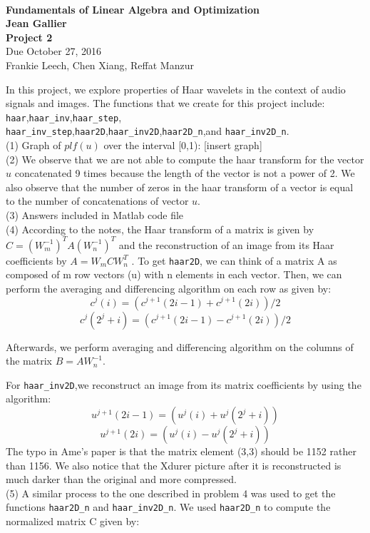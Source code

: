 \documentclass[12pt]{article}
\begin{document}
\begin{center}
\\
\vspace{1cm}
{\Large\bf Fundamentals of Linear Algebra and Optimization\\
Jean Gallier \\
\vspace{0.5cm}
Project 2}\\[10pt]
Due October 27, 2016\\
Frankie Leech, Chen Xiang, Reffat Manzur\\
\end{center}

\vspace{0.5cm}

\medskip

In this project, we explore properties of Haar wavelets in the context of audio signals and images. The functions that we create for this project include: {\tt haar},{\tt haar\_inv},{\tt haar\_step},\\{\tt haar\_inv\_step},{\tt haar2D},{\tt haar\_inv2D},{\tt haar2D\_n},and {\tt haar\_inv2D\_n}.
\medskip\\
(1) Graph of $plf(u)$ over the interval [0,1):
[insert graph]
\medskip
\\(2) We observe that we are not able to compute the haar transform for the vector $u$ concatenated 9 times because the length of the vector is not a power of 2. We also observe that the number of zeros in the haar transform of a vector is equal to the number of concatenations of vector $u$.
\medskip\\
(3) Answers included in Matlab code file
\medskip\\
(4)
According to the notes, the Haar transform of a matrix is given by $C = (W_m^{-1})^T A (W_n^{-1})^T$ and the reconstruction of an image from its Haar coefficients by $A = W_m C W_n^T$ . To get {\tt haar2D}, we can think of a matrix A as    composed of m row vectors (u) with n elements in each vector. Then, we can perform the averaging and differencing algorithm on each row as given by:
$$c^j(i) = (c^{j+1}(2i -1) + c^{j+1}(2i))/2$$  
$$c^j(2^j+i) = (c^{j+1}(2i -1) - c^{j+1}(2i))/2$$ 

Afterwards, we perform averaging and differencing algorithm on the columns of the matrix $B=A W_n^{-1}$.

For {\tt haar\_inv2D},we reconstruct an image from its matrix coefficients by using the algorithm: 
$$u^{j+1}(2i-1) = (u^{j}(i) + u^{j}(2^j+i))$$  
$$u^{j+1}(2i) = (u^{j}(i) - u^{j}(2^j+i))$$
The typo in Ame's paper is that the matrix element 
(3,3) should be 1152 rather than 1156. We also notice that the Xdurer picture after it is reconstructed is much darker than the original and more compressed.
\medskip\\
(5)
A similar process to the one described in problem 4 was used to get the functions {\tt haar2D\_n} and {\tt haar\_inv2D\_n}.
We used {\tt haar2D\_n} to compute the normalized matrix C given by:
\end{document}
